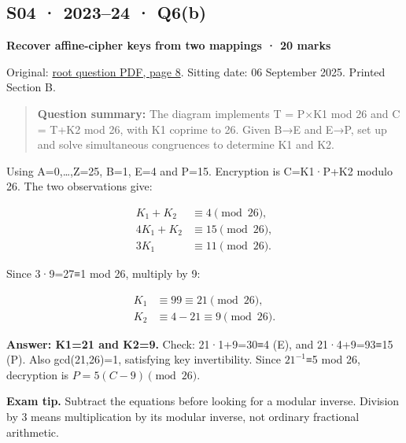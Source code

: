 \documentclass[11pt,a4paper]{article}
\begin{document}
\clearpage
\subsection{S04 · 2023–24 · Q6(b)}\label{s04}

\textbf{Recover affine-cipher keys from two mappings · 20 marks}


Original: \href{../../CSE405-Security_Merged.pdf\#page=8}{root question PDF,\allowbreak{} page 8}. Sitting date: 06 September 2025. Printed Section B.



\begin{quote}\small

\textbf{Question summary:} The diagram implements T =\allowbreak{} P×K1 mod 26 and C =\allowbreak{} T+K2 mod 26,\allowbreak{} with K1 coprime to 26. Given B→E and E→P,\allowbreak{} set up and solve simultaneous congruences to determine K1 and K2.



\end{quote}

Using A=\allowbreak{}0,\allowbreak{}…,\allowbreak{}Z=\allowbreak{}25,\allowbreak{} B=\allowbreak{}1,\allowbreak{} E=\allowbreak{}4 and P=\allowbreak{}15. Encryption is C=\allowbreak{}K1·P+K2 modulo 26. The two observations give:



\[
\begin{aligned}K_1+K_2&\equiv4\pmod{26},\\4K_1+K_2&\equiv15\pmod{26},\\3K_1&\equiv11\pmod{26}.\end{aligned}
\]

Since 3·9=\allowbreak{}27≡1 mod 26,\allowbreak{} multiply by 9:



\[
\begin{aligned}K_1&\equiv99\equiv21\pmod{26},\\K_2&\equiv4-21\equiv9\pmod{26}.\end{aligned}
\]

\textbf{Answer: K1=\allowbreak{}21 and K2=\allowbreak{}9.} Check: 21·1+9=\allowbreak{}30≡4 (E),\allowbreak{} and 21·4+9=\allowbreak{}93≡15 (P). Also gcd(21,\allowbreak{}26)=\allowbreak{}1,\allowbreak{} satisfying key invertibility. Since \(21^{-1}\)≡5 mod 26,\allowbreak{} decryption is \(P=5(C-9)\pmod{26}\).



{\color{ForestGreen}\textbf{Exam tip.} Subtract the equations before looking for a modular inverse. Division by 3 means multiplication by its modular inverse,\allowbreak{} not ordinary fractional arithmetic.}
\end{document}
